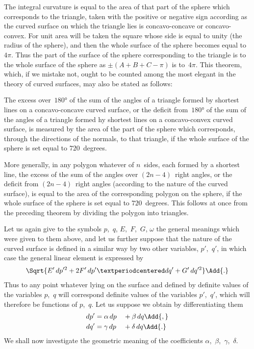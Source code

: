 The integral curvature is equal to the area of that part of the sphere which corresponds
to the triangle, taken with the positive or negative sign according as the
curved surface on which the triangle lies is concavo-concave or concavo-convex. For
unit area will be taken the square whose side is equal to unity (the radius of the
sphere), and then the whole surface of the sphere becomes equal to~$4\pi$. Thus the
part of the surface of the sphere corresponding to the triangle is to the whole surface
of the sphere as $±(A + B + C - \pi)$ is to~$4\pi$. This theorem, which, if we mistake
not, ought to be counted among the most elegant in the theory of curved surfaces,
may also be stated as follows:

\begin{Theorem}[]
The excess over~$180°$ of the sum of the angles of a triangle formed by shortest lines
on a concavo-concave curved surface, or the deficit from~$180°$ of the sum of the angles of
a triangle formed hy shortest lines on a concavo-convex curved surface, is measured by the
area of the part of the sphere which corresponds, through the directions of the normals, to
that triangle, if the whole surface of the sphere is set equal to $720$~degrees.
\end{Theorem}

More generally, in any polygon whatever of $n$~sides, each formed by a shortest
line, the excess of the sum of the angles over $(2n - 4)$~right angles, or the deficit from
$(2n - 4)$~right angles (according to the nature of the curved surface), is equal to the
area of the corresponding polygon on the sphere, if the whole surface of the sphere is
set equal to $720$~degrees. This follows at once from the preceding theorem by dividing
the polygon into triangles.



Let us again give to the symbols $p$,~$q$, $E$,~$F$,~$G$, $\omega$ the general meanings which
were given to them above, and let us further suppose that the nature of the curved
surface is defined in a similar way by two other variables, $p'$,~$q'$, in which case the
general linear element is expressed by
\[
\Sqrt{E'\, dp'^{2} + 2F'\, dp'·dq' + G'\, dq'^{2}}\Add{.}
\]
Thus to any point whatever lying on the surface and defined by definite values of
the variables $p$,~$q$ will correspond definite values of the variables $p'$,~$q'$, which will
therefore be functions of $p$,~$q$. Let us suppose we obtain by differentiating them
\begin{alignat*}{2}
dp' &= \alpha\, dp &&+ \beta\,  dq\Add{,} \\
dq' &= \gamma\, dp &&+ \delta\, dq\Add{.}
\end{alignat*}
We shall now investigate the geometric meaning of the coefficients $\alpha$,~$\beta$,~$\gamma$,~$\delta$.


